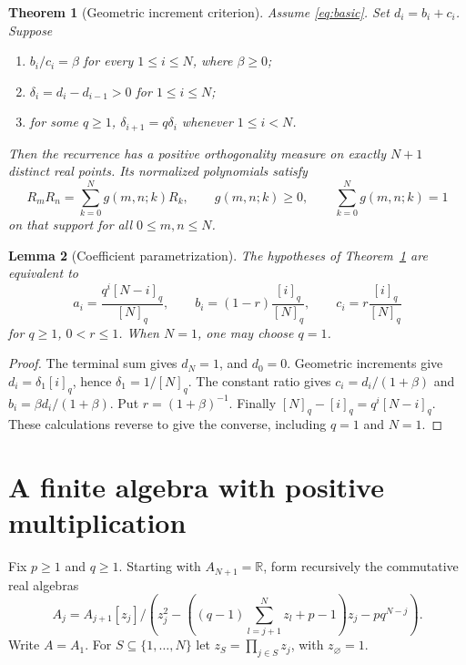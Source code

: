\documentclass[11pt]{article}
\newtheorem{theorem}{Theorem}
\newtheorem{lemma}[theorem]{Lemma}
\begin{document}
\begin{theorem}[Geometric increment criterion]\label{thm:criterion}
Assume \eqref{eq:basic}. Set $d_i=b_i+c_i$. Suppose
\begin{enumerate}
\item $b_i/c_i=\beta$ for every $1\leq i\leq N$, where $\beta\geq0$;
\item $\delta_i=d_i-d_{i-1}>0$ for $1\leq i\leq N$;
\item for some $q\geq1$, $\delta_{i+1}=q\delta_i$ whenever $1\leq i<N$.
\end{enumerate}
Then the recurrence has a positive orthogonality measure on exactly $N+1$ distinct real points. Its normalized polynomials satisfy
\begin{equation}\label{eq:positive}
R_mR_n=\sum_{k=0}^N g(m,n;k)R_k,
\qquad g(m,n;k)\geq0,\qquad\sum_{k=0}^N g(m,n;k)=1
\end{equation}
on that support for all $0\leq m,n\leq N$.
\end{theorem}

\begin{lemma}[Coefficient parametrization]\label{lem:parameters}
The hypotheses of Theorem~\ref{thm:criterion} are equivalent to
\begin{equation}\label{eq:parameters}
a_i=\frac{q^i[N-i]_q}{[N]_q},\qquad
b_i=(1-r)\frac{[i]_q}{[N]_q},\qquad
c_i=r\frac{[i]_q}{[N]_q}
\end{equation}
for $q\geq1$, $0<r\leq1$. When $N=1$, one may choose $q=1$.
\end{lemma}
\begin{proof}
The terminal sum gives $d_N=1$, and $d_0=0$. Geometric increments give $d_i=\delta_1[i]_q$, hence $\delta_1=1/[N]_q$. The constant ratio gives $c_i=d_i/(1+\beta)$ and $b_i=\beta d_i/(1+\beta)$. Put $r=(1+\beta)^{-1}$. Finally $[N]_q-[i]_q=q^i[N-i]_q$. These calculations reverse to give the converse, including $q=1$ and $N=1$.
\end{proof}

\section{A finite algebra with positive multiplication}
Fix $p\geq1$ and $q\geq1$. Starting with $A_{N+1}=\mathbb R$, form recursively the commutative real algebras
\begin{equation}\label{eq:algebra}
A_j=A_{j+1}[z_j]\big/
\left(z_j^2-\left((q-1)\sum_{l=j+1}^N z_l+p-1\right)z_j-pq^{N-j}\right).
\end{equation}
Write $A=A_1$. For $S\subseteq\{1,\ldots,N\}$ let $z_S=\prod_{j\in S}z_j$, with $z_\varnothing=1$.
\end{document}
